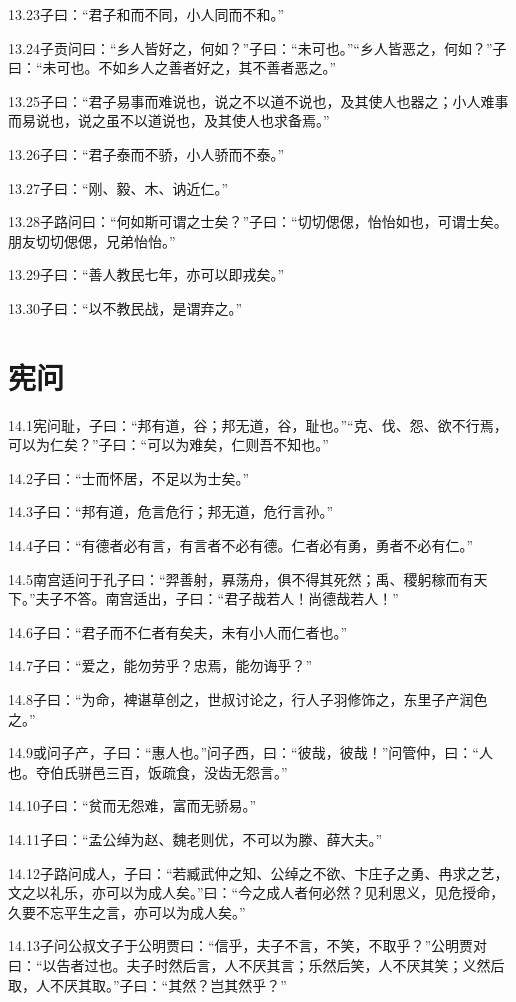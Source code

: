 \documentclass[a4paper,12pt,UTF8,twoside]{ctexbook}
\begin{document}
13.23子曰：“君子和而不同，小人同而不和。”

13.24子贡问曰：“乡人皆好之，何如？”子曰：“未可也。”“乡人皆恶之，何如？”子曰：“未可也。不如乡人之善者好之，其不善者恶之。”

13.25子曰：“君子易事而难说也，说之不以道不说也，及其使人也器之；小人难事而易说也，说之虽不以道说也，及其使人也求备焉。”

13.26子曰：“君子泰而不骄，小人骄而不泰。”

13.27子曰：“刚、毅、木、讷近仁。”

13.28子路问曰：“何如斯可谓之士矣？”子曰：“切切偲偲，怡怡如也，可谓士矣。朋友切切偲偲，兄弟怡怡。”

13.29子曰：“善人教民七年，亦可以即戎矣。”

13.30子曰：“以不教民战，是谓弃之。”

\chapter{宪问}

14.1宪问耻，子曰：“邦有道，谷；邦无道，谷，耻也。”“克、伐、怨、欲不行焉，可以为仁矣？”子曰：“可以为难矣，仁则吾不知也。”

14.2子曰：“士而怀居，不足以为士矣。”

14.3子曰：“邦有道，危言危行；邦无道，危行言孙。”

14.4子曰：“有德者必有言，有言者不必有德。仁者必有勇，勇者不必有仁。”

14.5南宫适问于孔子曰：“羿善射，奡荡舟，俱不得其死然；禹、稷躬稼而有天下。”夫子不答。南宫适出，子曰：“君子哉若人！尚德哉若人！”

14.6子曰：“君子而不仁者有矣夫，未有小人而仁者也。”

14.7子曰：“爱之，能勿劳乎？忠焉，能勿诲乎？”

14.8子曰：“为命，裨谌草创之，世叔讨论之，行人子羽修饰之，东里子产润色之。”

14.9或问子产，子曰：“惠人也。”问子西，曰：“彼哉，彼哉！”问管仲，曰：“人也。夺伯氏骈邑三百，饭疏食，没齿无怨言。”

14.10子曰：“贫而无怨难，富而无骄易。”

14.11子曰：“孟公绰为赵、魏老则优，不可以为滕、薛大夫。”

14.12子路问成人，子曰：“若臧武仲之知、公绰之不欲、卞庄子之勇、冉求之艺，文之以礼乐，亦可以为成人矣。”曰：“今之成人者何必然？见利思义，见危授命，久要不忘平生之言，亦可以为成人矣。”

14.13子问公叔文子于公明贾曰：“信乎，夫子不言，不笑，不取乎？”公明贾对曰：“以告者过也。夫子时然后言，人不厌其言；乐然后笑，人不厌其笑；义然后取，人不厌其取。”子曰：“其然？岂其然乎？”
\end{document}
